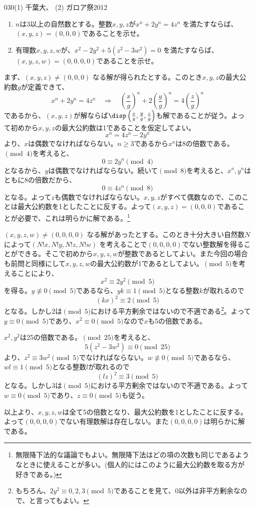 \begin{prob}{030}{}{(1) 千葉大、 (2) ガロア祭2012}
 \begin{enumerate}
  \item $n$は3以上の自然数とする。整数$x,y,z$が$x^n+2y^n=4z^n$ を満たすならば、$(x,y,z)=(0,0,0)$であることを示せ。
  \item 有理数$x,y,z,w$が、$x^2-2y^2+5(z^2-3w^2)=0$ を満たすならば、$(x,y,z,w)=(0,0,0,0)$であることを示せ。
 \end{enumerate}
\end{prob}

まず、$(x, y, z)\neq (0,0,0)$ なる解が得られたとする。このとき$x,y,z$の最大公約数$g$が定義できて、
\[ x^n+2y^n=4z^n \quad\Rightarrow\quad \left(\frac{x}{g}\right)^n+2\left(\frac{y}{g}\right)^n=4\left(\frac{z}{g}\right)^n \]
であるから、$(x,y,z)$が解ならば$\disp\left(\frac{x}{g},\frac{y}{g},\frac{z}{g}\right)$も解であることが従う。よって初めから$x,y,z$の最大公約数は1であることを仮定してよい。
\[ x^n=4z^n-2y^n \]
より、$x$は偶数でなければならない。$n\ge 3$であるから$x^n$は8の倍数である。$\pmod{4}$を考えると、
\[ 0\equiv 2y^n \pmod{4} \]
となるから、$y$は偶数でなければならない。続いて$\pmod{8}$を考えると、$x^n, y^n$はともに8の倍数だから、
\[ 0\equiv 4z^n \pmod{8} \]
となる。よって$z$も偶数でなければならない。$x,y,z$がすべて偶数なので、このことは最大公約数を1としたことに反する。よって$(x,y,z)=(0,0,0)$であることが必要で、これは明らかに解である。\footnote{無限降下法的な議論でもよい。無限降下法はどの項の次数も同じであるようなときに使えることが多い。(個人的にはこのように最大公約数を取る方が好きである。)}

$(x,y,z,w)\neq(0,0,0,0)$ なる解があったとする。このとき十分大きい自然数$N$によって$(N!x,N!y,N!z,N!w)$ を考えることで$(0,0,0,0)$でない整数解を得ることができる。そこで初めから$x,y,z,w$が整数であるとしてよい。また今回の場合も前問と同様にして$x,y,z,w$の最大公約数が1であるとしてよい。$\pmod{5}$を考えることにより、
\[ x^2\equiv 2y^2 \pmod{5} \]
を得る。$y\not\equiv 0 \pmod{5}$であるなら、$yk\equiv 1 \pmod{5}$となる整数$k$が取れるので
\[ (kx)^2\equiv 2 \pmod{5} \]
となる。しかし2は$\pmod{5}$における平方剰余ではないので不適である\footnote{もちろん、$2y^2\equiv 0,2,3 \pmod{5}$であることを見て、0以外は非平方剰余なので、と言ってもよい。}。よって$y\equiv 0\pmod{5}$であり、$x^2\equiv 0\pmod{5}$なので$x$も5の倍数である。

$x^2,y^2$は25の倍数である。$\pmod{25}$を考えると、
\[ 5(z^2-3w^2) \equiv 0 \pmod{25} \]
より、$z^2\equiv 3w^2 \pmod{5}$でなければならない。$w\not\equiv 0\pmod{5}$であるなら、$wl\equiv 1 \pmod{5}$となる整数$l$が取れるので
\[ (lz)^2\equiv 3 \pmod{5} \]
となる。しかし3は$\pmod{5}$における平方剰余ではないので不適である。よって$w\equiv 0\pmod{5}$であり、$z\equiv 0\pmod{5}$も従う。

以上より、$x,y,z,w$は全て5の倍数となり、最大公約数を1としたことに反する。よって$(0,0,0,0)$でない有理数解は存在しない。また$(0,0,0,0)$は明らかに解である。